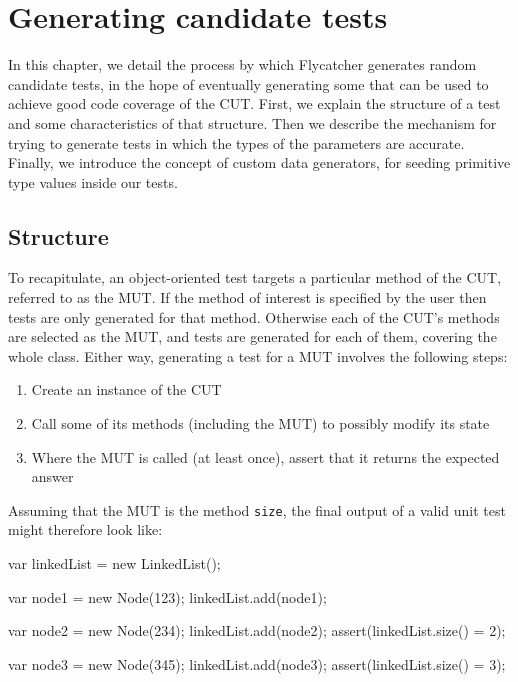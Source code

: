 \chapter{Generating candidate tests}
\label{randomtest}
In this chapter, we detail the process by which \textsf{Flycatcher} generates random candidate tests, in the hope of eventually generating some that can be used to achieve good code coverage of the CUT. First, we explain the structure of a test and some characteristics of that structure. Then we describe the mechanism for trying to generate tests in which the types of the parameters are accurate. Finally, we introduce the concept of custom data generators, for seeding primitive type values inside our tests.


\section{Structure}

To recapitulate, an object-oriented test targets a particular method of the CUT, referred to as the MUT. If the method of interest is specified by the user then tests are only generated for that method. Otherwise each of the CUT's methods are selected as the MUT, and tests are generated for each of them, covering the whole class. Either way, generating a test for a MUT involves the following steps:

\begin{enumerate}
	\item Create an instance of the CUT
	\item Call some of its methods (including the MUT) to possibly modify its state
	\item Where the MUT is called (at least once), assert that it returns the expected answer
\end{enumerate}

Assuming that the MUT is the method \texttt{size}, the final output of a valid unit test might therefore look like:

\begin{code}[caption=Unit test,label=final]
var linkedList = new LinkedList();

var node1 = new Node(123);
linkedList.add(node1);

var node2 = new Node(234);
linkedList.add(node2);
assert(linkedList.size() = 2);

var node3 = new Node(345);
linkedList.add(node3);
assert(linkedList.size() = 3);
\end{code}

